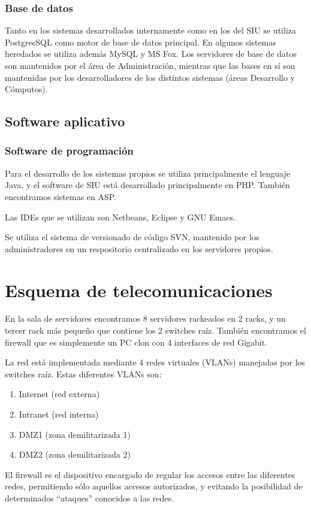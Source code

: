 \documentclass[a4paper,11pt,oneside]{article}
\begin{document}
\subsubsection*{Base de datos}
%
Tanto en los sistemas desarrollados internamente como en los del SIU
se utiliza PostgresSQL como motor de base de datos principal. En
algunos sistemas heredados se utiliza además MySQL y MS Fox.  Los
servidores de base de datos son mantenidos por el área de
Administración, mientras que las bases en sí son mantenidas por los
desarrolladores de los distintos sistemas (áreas Desarrollo y
Cómputos).
%
\subsection{Software aplicativo}
%
\subsubsection*{Software de programación}
%
Para el desarrollo de los sistemas propios se utiliza principalmente
el lenguaje Java, y el software de SIU está desarrollado
principalmente en PHP. También encontramos sistemas en ASP.

Las IDEs que se utilizan son Netbeans, Eclipse y GNU Emacs.

Se utiliza el sistema de versionado de código SVN, mantenido por los
administradores en un respositorio centralizado en los servidores
propios.
%
\section{Esquema de telecomunicaciones}

En la sala de servidores encontramos 8 servidores rackeados en 2
racks, y un tercer rack más pequeño que contiene los 2 switches
raíz. También encontramos el firewall que es simplemente un PC clon
con 4 interfaces de red Gigabit.

La red está implementada mediante 4 redes virtuales (VLANs) manejadas por
los switches raíz. Estas diferentes VLANs son:
\begin{enumerate}
\item Internet (red externa)
\item Intranet (red interna)
\item DMZ1 (zona demilitarizada 1)
\item DMZ2 (zona demilitarizada 2)
\end{enumerate}

El firewall es el dispositivo encargado de regular los accesos entre
las diferentes redes, permitiendo sólo aquellos accesos autorizados, y
evitando la posibilidad de determinados ``ataques'' conocidos a las
redes.
\end{document}

